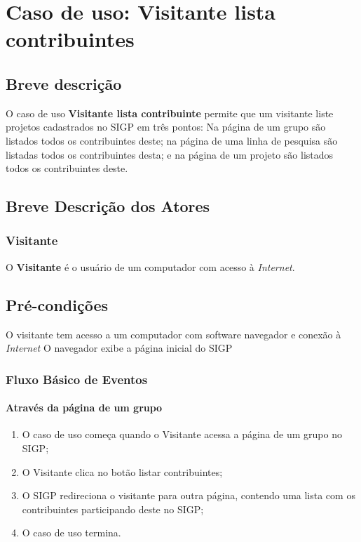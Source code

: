 \documentclass[11pt, a4paper,oneside]{book}
\begin{document}
\chapter[Caso de Uso]{Caso de uso: \bf Visitante lista contribuintes}
\label{cap:casodeuso}	

\section{Breve descrição}

O caso de uso \textbf{Visitante lista contribuinte} permite que um visitante liste projetos cadastrados no SIGP em três pontos: Na página de um grupo são listados todos os contribuintes deste; na página de uma linha de pesquisa são listadas todos os contribuintes desta; e na página de um projeto são listados todos os contribuintes deste.

\section{Breve Descrição dos Atores}

\subsection{Visitante}

O \textbf{Visitante} é o usuário de um computador com acesso à \emph{Internet}.

\section{Pré-condições}
O visitante tem acesso a um computador com software navegador e conexão à \emph{Internet}
O navegador exibe a página inicial do SIGP

\subsection{Fluxo Básico de Eventos}

\subsubsection{Através da página de um grupo}
\begin{enumerate}
\item O caso de uso começa quando o Visitante acessa a página de um grupo no SIGP;
\item O Visitante clica no botão listar contribuintes;
\item O SIGP redireciona o visitante para outra página, contendo uma lista com os contribuintes participando deste no SIGP;
\item O caso de uso termina.
\end{enumerate}
\end{document}
